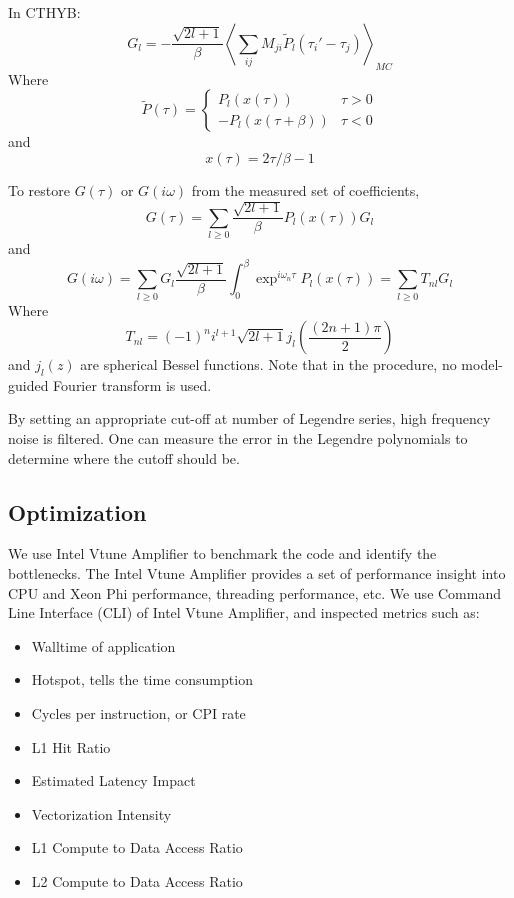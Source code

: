 In CTHYB:
\[
G_l=-\frac{\sqrt{2l+1}}{\beta}\left\langle\sum_{ij}M_{ji}\tilde{P}_l(\tau_i'-\tau_j)\right\rangle_{MC}
\]
Where
\[
\tilde{P}(\tau)=\left\{
\begin{array}{ll}
  P_l(x(\tau))& \tau >0\\
  -P_l(x(\tau+\beta))&\tau<0
\end{array}
\right.
\]
and \[
x(\tau)=2\tau/\beta-1
\]

To restore $G(\tau)$ or $G(i\omega)$ from the measured set of coefficients,
\[
G(\tau) = \sum_{l\ge 0}\frac{\sqrt{2l+1}}{\beta}P_l(x(\tau))G_l
\]
and
\[
G(i\omega) = \sum_{l\ge 0} G_l\frac{\sqrt{2l+1}}{\beta}\int_0^\beta\exp^{i\omega_n\tau}P_l(x(\tau))=\sum_{l\ge 0}T_{nl}G_l
\]
Where
\[
T_{nl}=(-1)^ni^{l+1}\sqrt{2l+1}j_l\left(\frac{(2n+1)\pi}{2}\right)
\]
and $j_l(z)$ are spherical Bessel functions. Note that in the procedure, no model-guided Fourier transform is used.

By setting an appropriate cut-off at number of Legendre series, high frequency noise is filtered. 
One can measure the error in the Legendre polynomials to determine where the cutoff should be.




\subsection{Optimization}
We use Intel Vtune Amplifier to benchmark the code and identify the bottlenecks.
The Intel Vtune Amplifier provides a set of performance insight into CPU and
Xeon Phi performance, threading performance, etc. We use Command Line Interface (CLI)
of Intel Vtune Amplifier, and inspected metrics such as:
\begin{itemize}
\item Walltime of application
\item Hotspot, tells the time consumption 
\item Cycles per instruction, or CPI rate %
\item L1 Hit Ratio
\item Estimated Latency Impact
\item Vectorization Intensity
\item L1 Compute to Data Access Ratio
\item L2 Compute to Data Access Ratio
\end{itemize}

